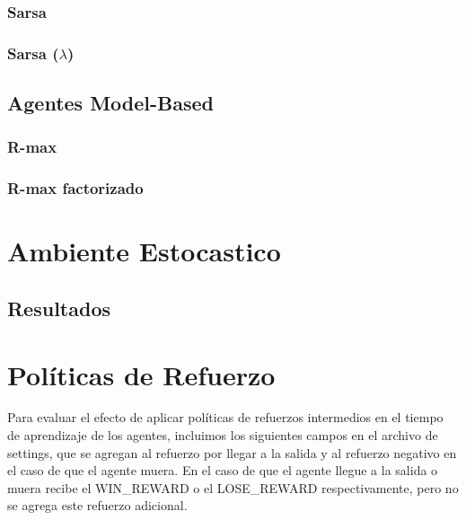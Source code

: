 \documentclass[a4paper,spanish] {article}
\begin{document}
		\subsubsection{Sarsa}
		\subsubsection{Sarsa ($\lambda$)}	
	\subsection{Agentes Model-Based}	
		\subsubsection{R-max}
		\subsubsection{R-max factorizado}

\section{Ambiente Estocastico}
	\subsection{Resultados}
	
 \section{Políticas de Refuerzo}
 	Para evaluar el efecto de aplicar políticas de refuerzos intermedios en el tiempo de aprendizaje de los agentes, incluimos los siguientes campos en el archivo de settings, que se agregan al refuerzo por llegar a la salida y al refuerzo negativo en el caso de que el agente muera. En el caso de que el agente llegue a la salida o muera recibe el WIN_REWARD o el LOSE_REWARD respectivamente, pero no se agrega este refuerzo adicional.
\end{document}
